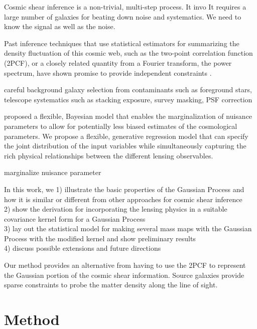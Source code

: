 Cosmic shear inference is a non-trivial, multi-step process. It invo 
It requires a large number of galaxies for beating down noise and systematics. 
We need to know the signal as well as the noise. 



Past inference techniques that use statistical estimators for summarizing the 
density fluctuation of this cosmic web, such as  
the two-point correlation function (2PCF), or a closely related quantity from a
Fourier transform, the power spectrum, have shown promise to provide 
independent constraints \citep{Jee2013a}.  

careful background galaxy selection from contaminants
such as foreground stars, telescope systematics such as stacking exposure, 
survey masking, PSF correction 


\cite{Schneider2014} proposed a flexible, Bayesian model that enables the
marginalization of nuisance parameters to allow for potentially less biased 
estimates of the cosmological parameters. 
We propose a flexible, generative regression model    
that can specify the joint distribution of the input variables while 
simultaneously capturing the rich physical relationships between the different
lensing observables.  



marginalize nuisance parameter 


In this work, we 
1) illustrate the basic properties of the Gaussian Process and how it is
similar or different from other approaches for cosmic shear inference  \\ 
2) show the derivation for incorporating the lensing physics in 
a suitable covariance kernel form for a Gaussian Process  \\
3) lay out the statistical model for making several mass maps 
with the Gaussian Process with the modified kernel and show preliminary results \\ 
4) discuss possible extensions and future directions 
 
Our method provides an alternative from having to use the 2PCF to represent the
Gaussian portion of the cosmic shear information. 
Source galaxies provide sparse constraints to probe the matter density along
the line of sight. 

\section{Method}

